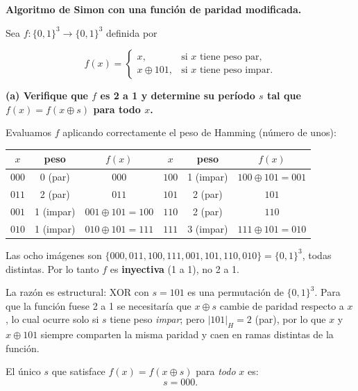 {\bfseries Algoritmo de Simon con una función de paridad modificada.

Sea $f : \{0,1\}^3 \to \{0,1\}^3$ definida por

$$
    f(x) =
    \begin{cases}
        x,            & \text{si } x \text{ tiene peso par},   \\
        x \oplus 101, & \text{si } x \text{ tiene peso impar}.
    \end{cases}
$$
}

{\bfseries (a) Verifique que $f$ es 2 a 1 y determine su período $s$ tal que $f(x)=f(x\oplus s)$ para todo $x$.}

Evaluamos $f$ aplicando correctamente el peso de Hamming (número de unos):

\begin{center}
    \begin{tabular}{c|c|c||c|c|c}
        $x$   & peso      & $f(x)$                & $x$   & peso      & $f(x)$                \\ \hline
        $000$ & 0 (par)   & $000$                 & $100$ & 1 (impar) & $100\oplus 101 = 001$ \\
        $011$ & 2 (par)   & $011$                 & $101$ & 2 (par)   & $101$                 \\
        $001$ & 1 (impar) & $001\oplus 101 = 100$ & $110$ & 2 (par)   & $110$                 \\
        $010$ & 1 (impar) & $010\oplus 101 = 111$ & $111$ & 3 (impar) & $111\oplus 101 = 010$ \\
    \end{tabular}
\end{center}

Las ocho imágenes son $\{000, 011, 100, 111, 001, 101, 110, 010\} = \{0,1\}^3$, todas distintas. Por lo tanto $f$ es \textbf{inyectiva} (1 a 1), no 2 a 1.

La razón es estructural: XOR con $s = 101$ es una permutación de $\{0,1\}^3$. Para que la función fuese 2 a 1 se necesitaría que $x \oplus s$ cambie de paridad respecto a $x$, lo cual ocurre solo si $s$ tiene peso \emph{impar}; pero $|101|_H = 2$ (par), por lo que $x$ y $x\oplus 101$ siempre comparten la misma paridad y caen en ramas distintas de la función.

El único $s$ que satisface $f(x) = f(x \oplus s)$ para \emph{todo} $x$ es:
$$
    \boxed{s = 000.}
$$

\vspace{0.5cm}

